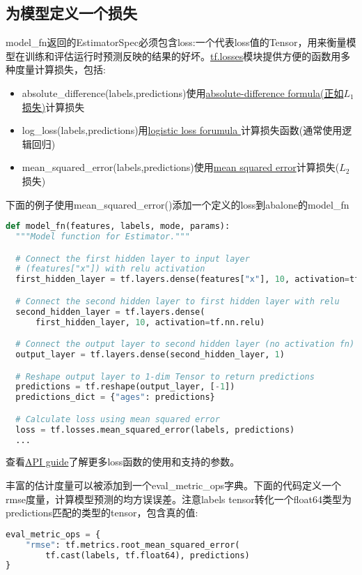 \subsection{为模型定义一个损失}
model\_fn返回的EstimatorSpec必须包含loss:一个代表loss值的Tensor，用来衡量模型在训练和评估运行时预测反映的结果的好坏。\href{https://www.tensorflow.org/api_docs/python/tf/losses}{tf.losses}模块提供方便的函数用多种度量计算损失，包括:
\begin{itemize}
\item absolute_difference(labels,predictions)使用\href{https://en.wikipedia.org/wiki/Deviation_(statistics)#Unsigned_or_absolute_deviation}{absolute-difference formula(正如$L_1$损失)}计算损失
\item log\_loss(labels,predictions)用\href{https://en.wikipedia.org/wiki/Loss_functions_for_classification#Logistic_loss}{logistic loss forumula }计算损失函数(通常使用逻辑回归)
\item mean\_squared\_error(labels,predictions)使用\href{https://en.wikipedia.org/wiki/Mean_squared_error}{mean squared error}计算损失($L_2$损失)
\end{itemize}
下面的例子使用mean\_squared\_error()添加一个定义的loss到abalone的model\_fn
\begin{lstlisting}[language=Python]
def model_fn(features, labels, mode, params):
  """Model function for Estimator."""

  # Connect the first hidden layer to input layer
  # (features["x"]) with relu activation
  first_hidden_layer = tf.layers.dense(features["x"], 10, activation=tf.nn.relu)

  # Connect the second hidden layer to first hidden layer with relu
  second_hidden_layer = tf.layers.dense(
      first_hidden_layer, 10, activation=tf.nn.relu)

  # Connect the output layer to second hidden layer (no activation fn)
  output_layer = tf.layers.dense(second_hidden_layer, 1)

  # Reshape output layer to 1-dim Tensor to return predictions
  predictions = tf.reshape(output_layer, [-1])
  predictions_dict = {"ages": predictions}

  # Calculate loss using mean squared error
  loss = tf.losses.mean_squared_error(labels, predictions)
  ...
\end{lstlisting}
查看\href{https://www.tensorflow.org/api_guides/python/contrib.losses}{API guide}了解更多loss函数的使用和支持的参数。

丰富的估计度量可以被添加到一个eval\_metric\_ops字典。下面的代码定义一个rmse度量，计算模型预测的均方误误差。注意labels tensor转化一个float64类型为predictions匹配的类型的tensor，包含真的值:
\begin{lstlisting}[language=Python]
eval_metric_ops = {
    "rmse": tf.metrics.root_mean_squared_error(
        tf.cast(labels, tf.float64), predictions)
}
\end{lstlisting}
